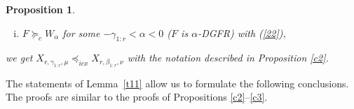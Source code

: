 \documentclass [11pt]{article}
\newtheorem{proposition}{Proposition}
\newtheorem{corollary}{Corollary}
\newcommand{\gos}{GOS}
\begin{document}
\begin{proposition}
\begin{enumerate}[(i)]
    \item
    $F\succeq_c W_\alpha$ for some $-\gamma_{1:r} < \alpha <0$
    ($F$ is $\alpha$-DGFR) with (\ref{22}),
    \end{enumerate}
we get $X_{r,\gamma_{1:r},\mu} \preceq_{icx}X_{r,\beta_{1:r},\nu}$ with the notation described in Proposition {\rm \ref{c2}}.

\end{proposition}



The statements of Lemma~\ref{t11} allow us to formulate the following conclusions. The proofs are similar to the proofs of
Propositions \ref{c2}--\ref{c3}.
\end{document}
